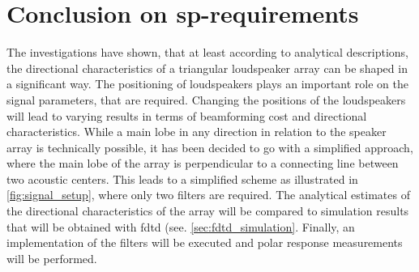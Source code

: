 \section{Conclusion on \gls{sp}-requirements}\label{sec:genetic_con}
The investigations have shown, that at least according to analytical descriptions, the directional characteristics of a triangular loudspeaker array can be shaped in a significant way. The positioning of loudspeakers plays an important role on the signal parameters, that are required. Changing the positions of the loudspeakers will lead to varying results in terms of beamforming cost and directional characteristics. While a main lobe in any direction in relation to the speaker array is technically possible, it has been decided to go with a simplified approach, where the main lobe of the array is perpendicular to a connecting line between two acoustic centers. This leads to a simplified scheme as illustrated in \autoref{fig:signal_setup}, where only two filters are required. The analytical estimates of the directional characteristics of the array will be compared to simulation results that will be obtained with \gls{fdtd} (see. \autoref{sec:fdtd_simulation}. Finally, an implementation of the filters will be executed and polar response measurements will be performed.